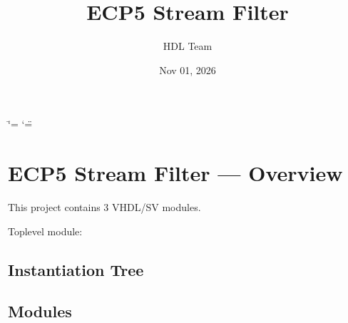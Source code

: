 \documentclass[letterpaper,10pt,english]{sphinxmanual}
\title{ECP5 Stream Filter}
\date{Nov 01, 2026}
\author{HDL Team}
\begin{document}
\ifdefined\shorthandoff
  \ifnum\catcode`\=\string=\active\shorthandoff{=}\fi
  \ifnum\catcode`\"=\active{}\fi
\fi

\pagestyle{empty}
\sphinxmaketitle
\pagestyle{plain}
\sphinxtableofcontents
\pagestyle{normal}
\label{\detokenize{index::doc}}


\sphinxstepscope


\chapter{ECP5 Stream Filter — Overview}
\label{\detokenize{overview:ecp5-stream-filter-overview}}\label{\detokenize{overview::doc}}
\sphinxAtStartPar
This project contains 3 VHDL/SV modules.

\sphinxAtStartPar
Top\sphinxhyphen{}level module: {\hyperref[\detokenize{modules/top/index::doc}]{}}


\section{Instantiation Tree}
\label{\detokenize{overview:instantiation-tree}}


\section{Modules}
\label{\detokenize{overview:modules}}
\end{document}
